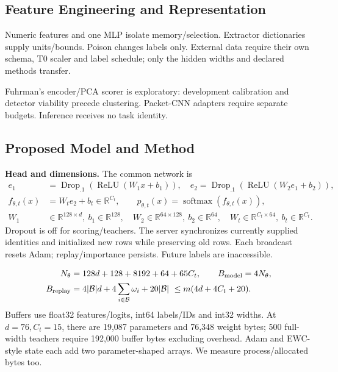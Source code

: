 \documentclass[10pt,a4paper]{article}
\begin{document}
\subsection{Feature Engineering and Representation}
Numeric features and one MLP isolate memory/selection. Extractor dictionaries supply units/bounds. Poison changes labels only.
External data require their own schema, T0 scaler and label schedule; only the hidden widths and declared methods transfer.

Fuhrman's encoder/PCA scorer is exploratory: development calibration and detector viability precede clustering. Packet-CNN adapters require separate budgets. Inference receives no task identity.

\subsection{Proposed Model and Method}
\textbf{Head and dimensions.} The common network is
\begin{equation}
\begin{aligned}
e_1&=\operatorname{Drop}_{.1}(\operatorname{ReLU}(W_1x+b_1)),\quad
e_2=\operatorname{Drop}_{.1}(\operatorname{ReLU}(W_2e_1+b_2)),\\
f_{\theta,t}(x)&=W_te_2+b_t\in\mathbb R^{C_t},\qquad
p_{\theta,t}(x)=\operatorname{softmax}(f_{\theta,t}(x)),\\
W_1&\in\mathbb R^{128\times d},\ b_1\in\mathbb R^{128},\quad
W_2\in\mathbb R^{64\times128},\ b_2\in\mathbb R^{64},\quad
W_t\in\mathbb R^{C_t\times64},\ b_t\in\mathbb R^{C_t}.
\end{aligned}
\label{eq:head}
\end{equation}
Dropout is off for scoring/teachers. The server synchronizes currently supplied identities and initialized new rows while preserving old rows. Each broadcast resets Adam; replay/importance persists. Future labels are inaccessible.

\begin{equation}
\begin{aligned}
N_\theta&=128d+128+8192+64+65C_t,\qquad B_{\rm model}=4N_\theta,\\
B_{\rm replay}&=4|\mathcal B|d+4\sum_{i\in\mathcal B}\omega_i+20|\mathcal B|\ \le m(4d+4C_t+20).
\end{aligned}
\label{eq:bytes}
\end{equation}
Buffers use float32 features/logits, int64 labels/IDs and int32 widths. At $d=76,C_t=15$, there are 19,087 parameters and 76,348 weight bytes; 500 full-width teachers require 192,000 buffer bytes excluding overhead. Adam and EWC-style state each add two parameter-shaped arrays. We measure process/allocated bytes too.
\end{document}
